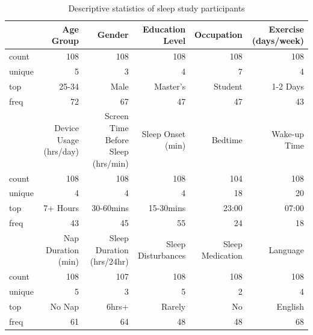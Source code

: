 \documentclass[conference]{IEEEtran}
\begin{document}
\begin{table}
    \centering
    \caption{Descriptive statistics of sleep study participants}
    \label{tab:sleep_data2}
    \begin{tabular}{lrrrrr}
    \hline
    & Age Group & Gender & Education Level & Occupation & Exercise (days/week) \\ \hline
    count & 108 & 108 & 108 & 108 & 108 \\
    unique & 5 & 3 & 4 & 7 & 4 \\
    top & 25-34 & Male & Master's & Student & 1-2 Days \\
    freq & 72 & 67 & 47 & 47 & 43 \\ \hline
    & Device Usage (hrs/day) & Screen Time Before Sleep (hrs/min) & Sleep Onset (min) & Bedtime & Wake-up Time \\ \hline
    count & 108 & 108 & 108 & 104 & 108 \\
    unique & 4 & 4 & 4 & 18 & 20 \\
    top & 7+ Hours & 30-60mins & 15-30mins & 23:00 & 07:00 \\
    freq & 43 & 45 & 55 & 24 & 18 \\ \hline

    & Nap Duration (min) & Sleep Duration (hrs/24hr) & Sleep Disturbances & Sleep Medication & Language \\ \hline
    count & 108 & 107 & 108 & 108 & 108 \\
    unique & 5 & 3 & 5 & 2 & 4 \\
    top & No Nap & 6hrs+ & Rarely & No & English \\
    freq & 61 & 64 & 48 & 48 & 68 \\ \hline

    \end{tabular}
    \end{table}
    
\end{document}
